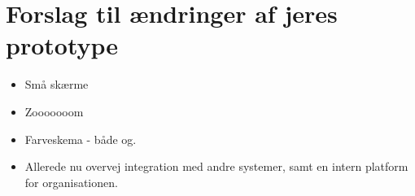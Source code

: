 \section{Forslag til ændringer af jeres prototype}

\begin{itemize}
\item Små skærme
\item Zooooooom
\item Farveskema - både og.
\item Allerede nu overvej integration med andre systemer, samt en intern
platform for organisationen.
\end{itemize}
